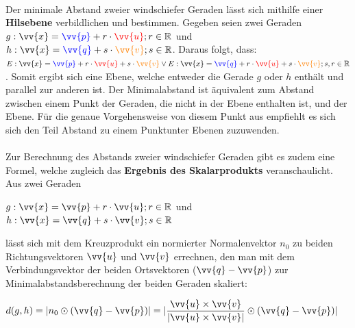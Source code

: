             \paragraph{} Der minimale Abstand zweier windschiefer Geraden lässt sich mithilfe einer \textbf{Hilsebene} verbildlichen und bestimmen. Gegeben
            seien zwei Geraden
            $g:\vv{x} = \textcolor{blue}{\vv{p}} + r \cdot \textcolor{red}{\vv{u}}; r\in\R$ und $h:\vv{x} = \textcolor{blue}{\vv{q}} + s \cdot \textcolor{orange}{\vv{v}}; s\in \R$.
            Daraus folgt, dass:
            $E:\vv{x} = \textcolor{blue}{\vv{p}} + r \cdot \textcolor{red}{\vv{u}} + s \cdot \textcolor{orange}{\vv{v}} \lor E:\vv{x} = \textcolor{blue}{\vv{q}} + r \cdot \textcolor{red}{\vv{u}} + s \cdot \textcolor{orange}{\vv{v}}; s,r\in\R$. Somit ergibt sich eine
            Ebene, welche entweder die Gerade $g$ oder $h$ enthält und parallel zur anderen ist. Der Minimalabstand ist äquivalent zum Abstand zwischen
            einem Punkt der Geraden, die nicht in der Ebene enthalten ist, und der Ebene. Für die genaue Vorgehensweise von diesem Punkt aus empfiehlt es
            sich sich den Teil \glqq Abstand zu einem Punkt\grqq  unter Ebenen zuzuwenden.
        \\
        \begin{Bemerkung}
            \paragraph{} Zur Berechnung des Abstands zweier windschiefer Geraden gibt es zudem eine Formel, welche zugleich das
            \textbf{Ergebnis des Skalarprodukts} veranschaulicht. Aus zwei Geraden
            \begin{center}
                \qquad $g:\vv{x} = \vv{p} + r \cdot \vv{u}; r\in\R$ \qquad und \qquad $h:\vv{x} = \vv{q} + s \cdot \vv{v}; s\in\R$
            \end{center}
            lässt sich mit dem Kreuzprodukt ein normierter Normalenvektor $n_0$ zu beiden Richtungsvektoren $\vv{u}$ und $\vv{v}$ errechnen, den man mit dem
            Verbindungsvektor der beiden Ortsvektoren ($\vv{q}-\vv{p}$) zur Minimalabstandsberechnung der beiden Geraden skaliert:
            \begin{center}
                \qquad $d(g,h)= |n_0 \odot (\vv{q}-\vv{p})| =  |\dfrac{\vv{u} \times \vv{v}}{|\vv{u} \times \vv{v}|} \odot (\vv{q}-\vv{p})|$
            \end{center}
        \end{Bemerkung}



